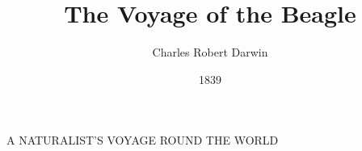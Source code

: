 \documentclass[a4paper, 12pt]{article}
\title{The Voyage of the Beagle}
\author{Charles Robert Darwin}
\date{1839}
\begin{document}
		\maketitle
		A NATURALIST'S VOYAGE ROUND THE WORLD
		
\end{document}
